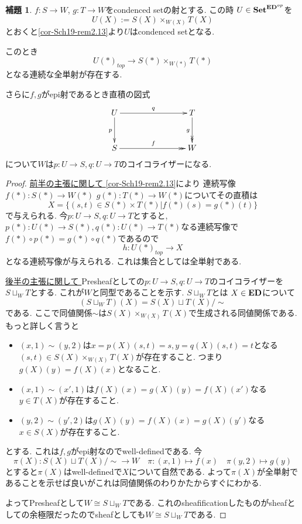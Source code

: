 \documentclass[dvipdfmx,a4paper,11pt]{article}
\theoremstyle{definition}
\newtheorem{lem}[thm]{補題}
\begin{document}
 \begin{tcolorbox}
 [colback = white, colframe = green!35!black, fonttitle = \bfseries,breakable = true]
  \begin{lem}\cite[Lemma 3.6.2]{Bar22}
\label{lem-ep-pullback}
$f: S \to W$, $g : T \to W$をcondenced setの射とする.
この時
 $U  \in {\bf Set}^{ { \bf ED }^{op}}$を
 $$
 U(X) := S(X) \times_{W(X)} T(X) 
 $$
とおくと\ref{cor-Sch19-rem2.13}より$U$はcondenced setとなる.  %

このとき$$U(\ast)_{top} \to S(\ast) \times_{W(\ast)} T(\ast)$$となる連続な全単射が存在する.

さらに$f, g$がepi射であるとき直積の図式
 \begin{equation*}
 \xymatrix@C=80pt@R=30pt{
U \ar@{->}[r]^{q}
\ar@{->}[d]_{p}
&T \ar@{->>}[d]_{g}
\\
S\ar@{->>}[r]^{f}
&W
 \\   
}
\end{equation*}
について$W$は$p : U \to S, q: U \to T$のコイコライザーになる. 

 \end{lem}
  \end{tcolorbox}
 \begin{proof}
   \underline{前半の主張に関して }
   \ref{cor-Sch19-rem2.13}により
連続写像$f(\ast) : S(\ast) \to W(\ast)$ $g(\ast) : T(\ast) \to W(\ast)$についてその直積は
 $$
 X =  \{(s,t) \in S(\ast) \times T(\ast) | f(\ast)(s) = g(\ast)(t) \}
 $$
 で与えられる. 今$p : U \to S, q : U \to T$とすると, $p(\ast) : U(\ast)  \to S(\ast) , q(\ast)  : U (\ast) \to T(\ast) $なる連続写像で$f(\ast)\circ p(\ast) = g(\ast) \circ q(\ast)$であるので
 $$
 h : U(\ast)_{top} \to  X
 $$
 となる連続写像が与えられる.  これは集合としては全単射である.
 
   \underline{後半の主張に関して }
 Presheafとしての$p : U \to S, q: U \to T$のコイコライザーを$S \sqcup_{W}T$とする.
 これが$W$と同型であることを示す. 
$S \sqcup_{W}T$とは
$X \in {\bf ED}$について
$$
(S \sqcup_{W}T)(X)
=
S(X) \sqcup T(X)/\sim
$$
である. ここで同値関係$\sim$は$S(X) \times_{W(X)} T(X)$で生成される同値関係である.
もっと詳しく言うと
\begin{itemize}
\item $(x,1) \sim (y , 2)$は$x=p(X)(s,t)=s, y=q(X)(s,t)=t$となる$(s,t) \in S(X) \times_{W(X)} T(X) $が存在すること. つまり$g(X)(y)=f(X)(x)$となること. 
\item $(x,1) \sim (x', 1)$は$f(X)(x)=g(X)(y)=f(X)(x')$なる$y \in T(X)$が存在すること.
\item $(y,2) \sim (y' , 2)$は$g(X)(y)=f(X)(x)=g(X)(y')$なる$x \in S(X)$が存在すること.
\end{itemize}
とする. 
これは$f, g$がepi射なのでwell-definedである. 
今
$$
\pi(X): S(X) \sqcup T(X)/\sim \to W
\quad
\pi : (x,1) \mapsto f(x)
\quad
\pi (y,2) \mapsto g(y)
$$
とすると$\pi(X)$はwell-definedで$X$について自然である.
よって$\pi(X)$が全単射であることを示せば良いがこれは同値関係のわりかたからすぐにわかる. 

よってPresheafとして$W \cong S \sqcup_{W}T$である.
これのsheafificationしたものがsheafとしての余極限だったのでsheafとしても$W \cong S \sqcup_{W}T$である. 
 \end{proof}
 
\end{document}
